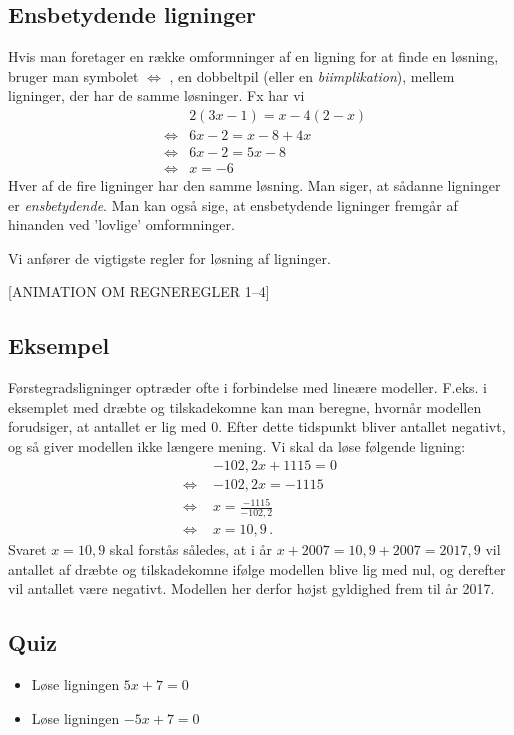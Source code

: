 \documentclass[12pt,oneside,a4paper]{article}
\newcommand{\bas}{\begin{eqnarray*}}
\newcommand{\eas}{\end{eqnarray*}}
\begin{document}
\subsection{Ensbetydende ligninger}
Hvis man foretager en række omformninger af en ligning for at finde en løsning,
bruger man symbolet $\Leftrightarrow$ , en dobbeltpil (eller en {\em
biimplikation}), mellem ligninger, der har de samme løsninger. Fx har vi
\bas
&& 2(3x - 1) = x - 4(2 - x)\\
&\Leftrightarrow& 6x - 2 = x - 8 + 4x\\
&\Leftrightarrow& 6x - 2 = 5x - 8 \\
&\Leftrightarrow& x = -6 
\eas
Hver af de fire ligninger har den samme løsning. Man siger, at sådanne
ligninger er {\em ensbetydende}. Man kan også sige, at ensbetydende ligninger
fremgår af hinanden ved ’lovlige’ omformninger.

Vi anfører de vigtigste regler for løsning af ligninger.

[ANIMATION OM REGNEREGLER 1--4]

\begin{tcolorbox}
\subsection{Eksempel}
Førstegradsligninger optræder ofte i forbindelse med lineære modeller. F.eks. i
eksemplet med dræbte og tilskadekomne kan man beregne, hvornår modellen
forudsiger, at antallet er lig med 0.  Efter dette tidspunkt bliver antallet
negativt, og så giver modellen ikke længere mening.  Vi skal da løse følgende
ligning:
\[
\begin{aligned}
    & -102,2x+1115 = 0  \\
    \Leftrightarrow\,\, & -102,2x = -1115 \\
    \Leftrightarrow\,\, & x = \frac{-1115}{-102,2} \\
    \Leftrightarrow\,\, & x = 10,9 \,.
\end{aligned}
\]
Svaret $x=10,9$ skal forstås således, at i år $x + 2007 = 10,9 + 2007 = 2017,9$
vil antallet af dræbte og tilskadekomne ifølge modellen blive lig med nul, og
derefter vil antallet være negativt.  Modellen her derfor højst gyldighed frem
til år 2017.
\end{tcolorbox}

\subsection{Quiz}
\begin{itemize}
    \item Løse ligningen $5x+7 = 0$
    \item Løse ligningen $-5x+7 = 0$
\end{itemize}
\end{document}

